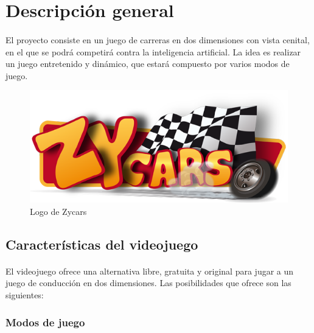 \documentclass[a4paper,11pt]{article} %
\begin{document}
\section{Descripción general}

\paragraph{}
El proyecto consiste en un juego de carreras en dos dimensiones con vista cenital, en el que se podrá competirá contra la 
inteligencia artificial. 
La idea es realizar un juego entretenido y dinámico, que estará compuesto por varios modos de juego.

\begin{figure}[H]
  \label{logo_zycars}
  \begin{center}
    \includegraphics[scale=0.5]{imagenes/logo_zycars.png}
  \end{center}
  \caption{Logo de Zycars}
\end{figure}

\subsection{Características del videojuego}

\paragraph{}
El videojuego ofrece una alternativa libre, gratuita y original para jugar a un juego de conducción en dos dimensiones. 
Las posibilidades que ofrece son las siguientes:

\subsubsection{Modos de juego}
\end{document}
